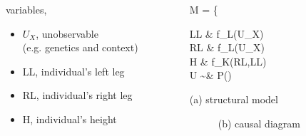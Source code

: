 \begin{frame}
\begin{columns}
\begin{column}{0.5\textwidth}
			variables,
			\begin{itemize}
				\item $U_{X}$, unobservable \\
				(e.g. genetics and context)
				\item LL, individual's left leg
				\item RL, individual's right leg
				\item H, individual's height
			\end{itemize}
		\end{column}
		\begin{column}{0.5\textwidth}  
			\begin{equ}
				M = \left\{ \begin{aligned} 
					LL \leftarrow & \; f_{L}(U_{X}) \\
					RL \leftarrow & \; f_{L}(U_{X}) \\
					H \leftarrow & \; f_{K}(RL,LL) \\
					U \sim & \; P()
				\end{aligned} \right
				\caption*{(a) structural model}
			\end{equ}
			\begin{figure}
				\caption*{(b) causal diagram}
			\end{figure}
		\end{column}
	\end{columns}
\end{frame}
%
%
